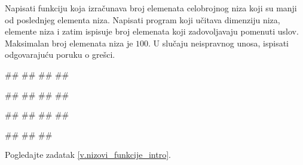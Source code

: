 \ifresenja
\begin{Answer}[ref=v.nizovi_funkcije_intro]
\end{Answer}
\fi


\begin{Exercise}[label=p.broj_manjih_od_poslednjeg] 
 Napisati funkciju koja izračunava broj elemenata celobrojnog niza koji su
 manji od poslednjeg elementa niza. 
 Napisati program koji učitava dimenziju niza, elemente niza i zatim ispisuje broj
 elemenata koji zadovoljavaju pomenuti uslov.
 Maksimalan broj elemenata niza je $100$.
 U slučaju neispravnog unosa, ispisati odgovarajuću poruku o grešci. 

\begin{miditest}
\begin{upotreba}{1}
#\naslovInt#
##
##
##
\end{upotreba}
\end{miditest}
\begin{miditest}
\begin{upotreba}{2}
#\naslovInt#
##
##
##
\end{upotreba}
\end{miditest}

\begin{miditest}
\begin{upotreba}{3}
#\naslovInt#
##
##
##
\end{upotreba}
\end{miditest}
\begin{miditest}
\begin{upotreba}{4}
#\naslovInt#
##
##
\end{upotreba}
\end{miditest}

\end{Exercise}

\ifresenja
\begin{Answer}[ref=p.broj_manjih_od_poslednjeg]

Pogledajte zadatak \ref{v.nizovi_funkcije_intro}.
\end{Answer}
\fi


